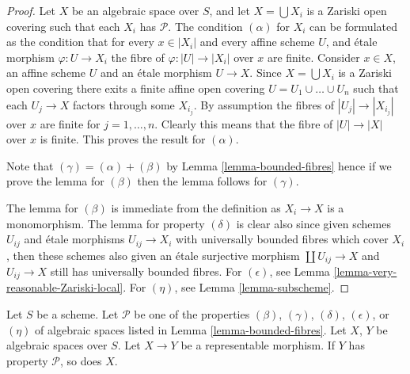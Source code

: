 \begin{proof}
Let $X$ be an algebraic space over $S$, and let $X = \bigcup X_i$ is a
Zariski open covering such that each $X_i$ has $\mathcal{P}$.
The condition $(\alpha)$ for $X_i$ can be formulated as the condition
that for every $x \in |X_i|$ and every affine scheme $U$, and \'etale morphism
$\varphi : U \to X_i$ the fibre of $\varphi : |U| \to |X_i|$
over $x$ are finite. Consider $x \in X$, an affine scheme $U$ and
an \'etale morphism $U \to X$. Since $X = \bigcup X_i$ is a
Zariski open covering there exits a finite affine open covering
$U = U_1 \cup \ldots \cup U_n$ such that each $U_j \to X$ factors through
some $X_{i_j}$. By assumption the fibres of $|U_j | \to |X_{i_j}|$
over $x$ are finite for $j = 1, \ldots, n$. Clearly this means that
the fibre of $|U| \to |X|$ over $x$ is finite.
This proves the result for $(\alpha)$.

\medskip\noindent
Note that $(\gamma) = (\alpha) + (\beta)$ by
Lemma \ref{lemma-bounded-fibres}
hence if we prove the lemma for $(\beta)$ then the lemma follows for
$(\gamma)$.

\medskip\noindent
The lemma for $(\beta)$ is immediate from the definition as $X_i \to X$ is
a monomorphism. The lemma for property $(\delta)$ is clear also since given
schemes $U_{ij}$ and \'etale morphisms $U_{ij} \to X_i$ with universally
bounded fibres which cover $X_i$, then these schemes also given an
\'etale surjective morphism $\coprod U_{ij} \to X$ and $U_{ij} \to X$
still has universally bounded fibres. For $(\epsilon)$, see
Lemma \ref{lemma-very-reasonable-Zariski-local}.
For $(\eta)$, see Lemma \ref{lemma-subscheme}.
\end{proof}

\begin{lemma}
\label{lemma-representable-properties}
Let $S$ be a scheme.
Let $\mathcal{P}$ be one of the properties
$(\beta)$, $(\gamma)$, $(\delta)$, $(\epsilon)$, or $(\eta)$
of algebraic spaces listed in Lemma \ref{lemma-bounded-fibres}.
Let $X$, $Y$ be algebraic spaces over $S$.
Let $X \to Y$ be a representable morphism.
If $Y$ has property $\mathcal{P}$, so does $X$.
\end{lemma}

